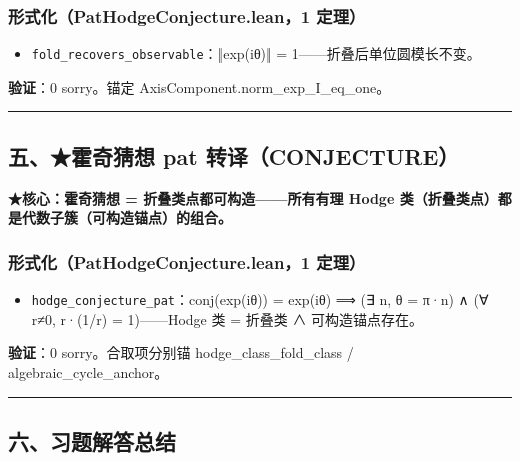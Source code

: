 \documentclass[
]{article}
\providecommand{\tightlist}{%
  \setlength{\itemsep}{0pt}\setlength{\parskip}{0pt}}
\begin{document}
\subsubsection{形式化（PatHodgeConjecture.lean，1
定理）}\label{ux5f62ux5f0fux5316pathodgeconjecture.lean1-ux5b9aux7406-3}

\begin{itemize}
\tightlist
\item
  \texttt{fold\_recovers\_observable}：‖exp(iθ)‖ =
  1------折叠后单位圆模长不变。
\end{itemize}

\textbf{验证}：0 sorry。锚定 AxisComponent.norm\_exp\_I\_eq\_one。

\begin{center}\rule{0.5\linewidth}{0.5pt}\end{center}

\subsection{五、★霍奇猜想 pat
转译（CONJECTURE）}\label{ux4e94ux970dux5947ux731cux60f3-pat-ux8f6cux8bd1conjecture}

\textbf{★核心：霍奇猜想 = 折叠类点都可构造------所有有理 Hodge
类（折叠类点）都是代数子簇（可构造锚点）的组合。}

\subsubsection{形式化（PatHodgeConjecture.lean，1
定理）}\label{ux5f62ux5f0fux5316pathodgeconjecture.lean1-ux5b9aux7406-4}

\begin{itemize}
\tightlist
\item
  \texttt{hodge\_conjecture\_pat}：conj(exp(iθ)) = exp(iθ) ⟹ (∃ n, θ =
  π·n) ∧ (∀ r≠0, r·(1/r) = 1)------Hodge 类 = 折叠类 ∧ 可构造锚点存在。
\end{itemize}

\textbf{验证}：0 sorry。合取项分别锚 hodge\_class\_fold\_class /
algebraic\_cycle\_anchor。

\begin{center}\rule{0.5\linewidth}{0.5pt}\end{center}

\subsection{六、习题解答总结}\label{ux516dux4e60ux9898ux89e3ux7b54ux603bux7ed3}
\end{document}
